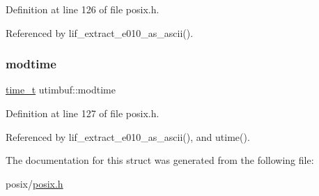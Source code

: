 Definition at line 126 of file posix.\+h.



Referenced by lif\+\_\+extract\+\_\+e010\+\_\+as\+\_\+ascii().

\mbox{\label{structutimbuf_a7588ffe699a9eda52e94aa593bf7d6d8}} 
\subsubsection{\texorpdfstring{modtime}{modtime}}
{\footnotesize\ttfamily \hyperlink{time_8h_a3346b04b0420b32ccf6b706551b70762}{time\+\_\+t} utimbuf\+::modtime}



Definition at line 127 of file posix.\+h.



Referenced by lif\+\_\+extract\+\_\+e010\+\_\+as\+\_\+ascii(), and utime().



The documentation for this struct was generated from the following file\+:\begin{DoxyCompactItemize}
\item 
posix/\hyperlink{posix_8h}{posix.\+h}\end{DoxyCompactItemize}
